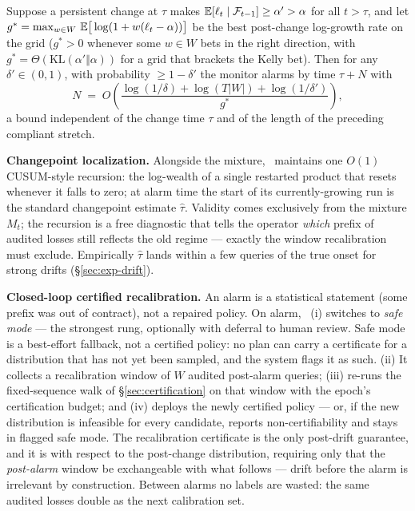 \begin{proposition}
\label{prop:delay}
Suppose a persistent change at $\tau$ makes
$\mathbb{E}[\ell_t \mid \mathcal{F}_{t-1}] \ge \alpha' > \alpha$ for all $t > \tau$,
and let $g^\ast = \max_{w \in W}\, \mathbb{E}\big[\log(1 + w(\ell_t - \alpha))\big]$
be the best post-change log-growth rate on the grid ($g^\ast > 0$ whenever
some $w \in W$ bets in the right direction, with
$g^\ast = \Theta(\mathrm{KL}(\alpha' \Vert \alpha))$ for a grid that
brackets the Kelly bet). Then for any $\delta' \in (0,1)$, with probability
$\ge 1 - \delta'$ the monitor alarms by time $\tau + N$ with
\[
N \;=\; O\!\left(\frac{\log(1/\delta) + \log(T|W|) + \log(1/\delta')}
                     {g^\ast}\right),
\]
a bound independent of the change time $\tau$ and of the length of the
preceding compliant stretch.
\end{proposition}

\textbf{Changepoint localization.} Alongside the mixture, \system\
maintains one $O(1)$ CUSUM-style recursion: the log-wealth of a single
restarted product that resets whenever it falls to zero; at alarm time
the start of its currently-growing run is the standard changepoint
estimate $\hat\tau$. Validity comes exclusively from the mixture
$M_t$; the recursion is a free diagnostic that tells the operator
\emph{which} prefix of audited losses still reflects the old regime ---
exactly the window recalibration must exclude. Empirically $\hat\tau$
lands within a few queries of the true onset for strong drifts
(\S\ref{sec:exp-drift}).

\textbf{Closed-loop certified recalibration.} An alarm is a statistical
statement (some prefix was out of contract), not a repaired policy. On
alarm, \system\ (i) switches to \emph{safe mode} --- the strongest rung,
optionally with deferral to human review. Safe mode is a best-effort
fallback, not a certified policy: no plan can carry a certificate for a
distribution that has not yet been sampled, and the system flags it as
such. (ii) It collects a recalibration window of $W$ audited post-alarm
queries; (iii) re-runs the fixed-sequence walk of
\S\ref{sec:certification} on that window with the epoch's certification
budget; and (iv) deploys the newly certified policy --- or, if the new
distribution is infeasible for every candidate, reports
non-certifiability and stays in flagged safe mode. The recalibration
certificate is the only post-drift guarantee, and it is with respect to
the post-change distribution, requiring only that the \emph{post-alarm}
window be exchangeable with what follows --- drift before the alarm is
irrelevant by construction. Between alarms no labels are wasted: the
same audited losses double as the next calibration set.

